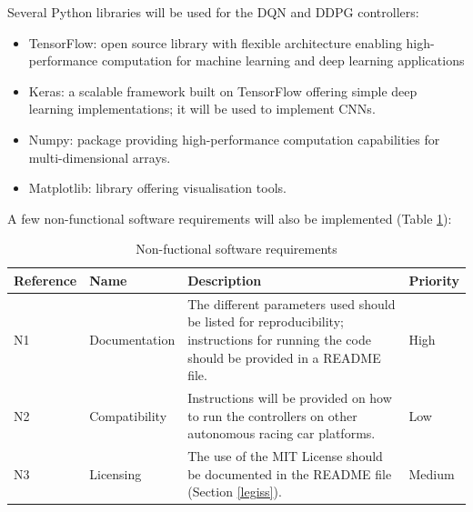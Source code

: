 Several Python libraries will be used for the DQN and DDPG controllers:
\begin{itemize}
	\item TensorFlow: open source library with flexible architecture enabling high-performance computation for machine learning and deep learning applications
	\item Keras: a scalable framework built on TensorFlow offering simple deep learning implementations; it will be used to implement CNNs.
	\item Numpy: package providing high-performance computation capabilities for multi-dimensional arrays.
	\item Matplotlib: library offering visualisation tools.
\end{itemize}

A few non-functional software requirements will also be implemented (Table \ref{nonfuncsoreqtab}):

\begin{table}[H]
\centering
\begin{tabularx}{\textwidth}{||l|X|X|l||} 
 \hline
 Reference & Name & Description & Priority\\ [0.5ex] 
 \hline\hline
 N1 & Documentation & The different parameters used should be listed for reproducibility; instructions for running the code should be provided in a README file. & High\\
 \hline
 N2 & Compatibility & Instructions will be provided on how to run the controllers on other autonomous racing car platforms. & Low\\
  \hline
 N3 & Licensing & The use of the MIT License should be documented in the README file (Section \ref{legiss}). & Medium\\
  \hline
\end{tabularx}
\caption{Non-fuctional software requirements}
\label{nonfuncsoreqtab}
\end{table}


